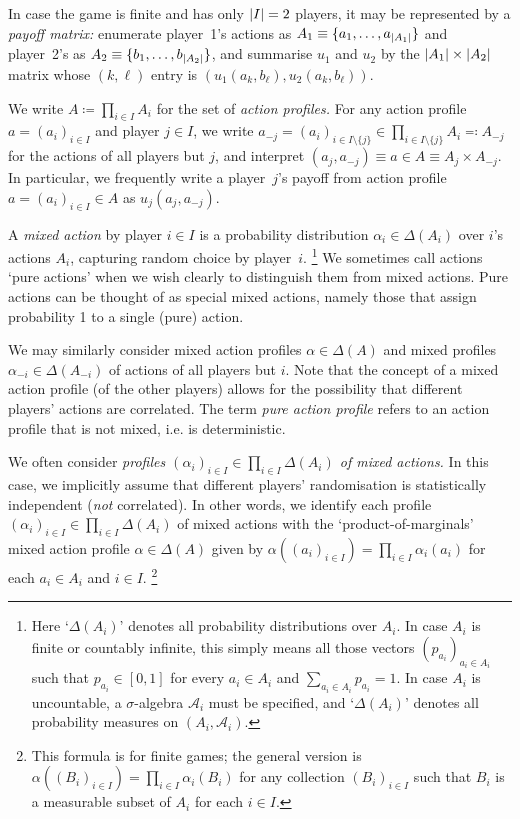 \documentclass[11pt,letterpaper,reqno,oneside]{book}
\begin{document}
In case the game is finite and has only $\abs*{I}=2$ players, it may be represented by a \emph{payoff matrix:} enumerate player~1's actions as $A_1 \equiv \{a_1,\dots,a_{\abs*{A_1}}\}$ and player~2's as $A_2 \equiv \{b_1,\dots,b_{\abs*{A_2}}\}$, and summarise $u_1$ and $u_2$ by the $\abs*{A_1} \times \abs*{A_2}$ matrix whose $(k,\ell)$ entry is $\left( u_1\left( a_k, b_\ell \right), u_2\left( a_k, b_\ell \right) \right)$.

We write $A \coloneqq \prod_{i \in I} A_i$ for the set of \emph{action profiles.} For any action profile $a = (a_i)_{i \in I}$ and player $j \in I$, we write $a_{-j} = (a_i)_{i \in I \setminus \{j\}} \in \prod_{i \in I \setminus \{j\}} A_i \eqqcolon A_{-j}$ for the actions of all players but $j$, and interpret $(a_j,a_{-j}) \equiv a \in A \equiv A_j \times A_{-j}$. In particular, we frequently write a player~$j$'s payoff from action profile $a = (a_i)_{i \in I} \in A$ as $u_j(a_j,a_{-j})$.

A \emph{mixed action} by player $i \in I$ is a probability distribution $\alpha_i \in \Delta(A_i)$ over $i$'s actions $A_i$, capturing random choice by player~$i$.%
	\footnote{Here `$\Delta(A_i)$' denotes all probability distributions over $A_i$. In case $A_i$ is finite or countably infinite, this simply means all those vectors $(p_{a_i})_{a_i \in A_i}$ such that $p_{a_i} \in [0,1]$ for every $a_i \in A_i$ and $\sum_{a_i \in A_i} p_{a_i} = 1$. In case $A_i$ is uncountable, a $\sigma$-algebra $\mathcal{A}_i$ must be specified, and `$\Delta(A_i)$' denotes all probability measures on $(A_i,\mathcal{A}_i)$.}
We sometimes call actions `pure actions' when we wish clearly to distinguish them from mixed actions. Pure actions can be thought of as special mixed actions, namely those that assign probability 1 to a single (pure) action.

We may similarly consider mixed action profiles $\alpha \in \Delta(A)$ and mixed profiles $\alpha_{-i} \in \Delta(A_{-i})$ of actions of all players but $i$. Note that the concept of a mixed action profile (of the other players) allows for the possibility that different players' actions are correlated. The term \emph{pure action profile} refers to an action profile that is not mixed, i.e. is deterministic.

We often consider \emph{profiles $(\alpha_i)_{i \in I} \in \prod_{i \in I} \Delta(A_i)$ of mixed actions.} In this case, we implicitly assume that different players' randomisation is statistically independent (\emph{not} correlated). In other words, we identify each profile $(\alpha_i)_{i \in I} \in \prod_{i \in I} \Delta(A_i)$ of mixed actions with the `product-of-marginals' mixed action profile $\alpha \in \Delta(A)$ given by $\alpha((a_i)_{i \in I}) = \prod_{i \in I} \alpha_i(a_i)$ for each $a_i \in A_i$ and $i \in I$.%
	\footnote{This formula is for finite games; the general version is $\alpha( (B_i)_{i \in I} ) = \prod_{i \in I} \alpha_i(B_i)$ for any collection $(B_i)_{i \in I}$ such that $B_i$ is a measurable subset of $A_i$ for each $i \in I$.} 
\end{document}
